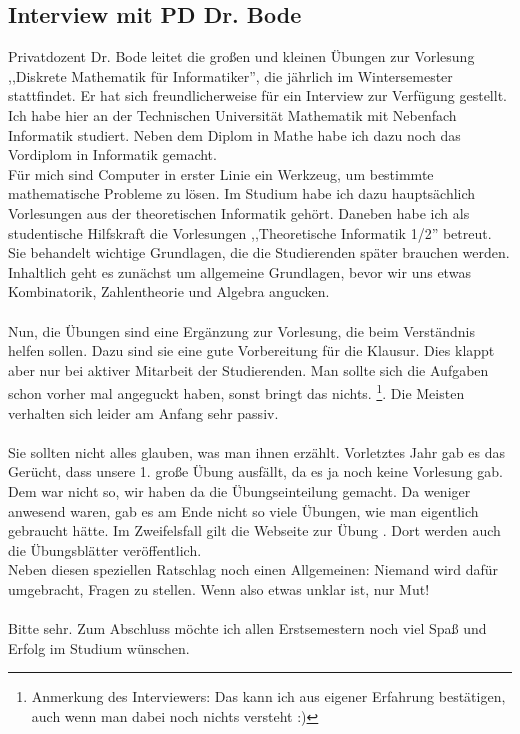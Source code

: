 \subsection{Interview mit PD Dr. Bode}

Privatdozent Dr. Bode leitet die großen und kleinen Übungen zur
Vorlesung ,,Diskrete Mathematik für Informatiker'', die jährlich im
Wintersemester stattfindet.  Er hat sich
freundlicherweise für ein Interview zur Verfügung gestellt.
 \\
Ich habe hier an der Technischen Universität Mathematik mit Nebenfach
Informatik studiert. Neben dem Diplom in Mathe habe ich dazu noch das
Vordiplom in Informatik gemacht.
\\
Für mich sind Computer in erster Linie ein Werkzeug, um bestimmte
mathematische Probleme zu lösen. Im Studium habe ich dazu
hauptsächlich Vorlesungen aus der theoretischen Informatik
gehört. Daneben habe ich als studentische Hilfskraft die Vorlesungen
,,Theoretische Informatik 1/2'' betreut.
\\
Sie behandelt wichtige Grundlagen, die die Studierenden später
brauchen werden. Inhaltlich geht es zunächst um allgemeine Grundlagen,
bevor wir uns etwas Kombinatorik, Zahlentheorie und Algebra angucken. \\
\\
Nun, die Übungen sind eine Ergänzung zur Vorlesung, die beim
Verständnis helfen sollen. Dazu sind sie eine gute Vorbereitung für
die Klausur. Dies klappt aber nur bei aktiver Mitarbeit der
Studierenden. Man sollte sich die Aufgaben schon vorher mal angeguckt
haben, sonst bringt das nichts. \footnote{Anmerkung des Interviewers:
Das kann ich aus eigener Erfahrung bestätigen, auch wenn man dabei
noch nichts versteht :)}. Die Meisten verhalten sich leider am Anfang
sehr passiv.\\
\\
Sie sollten  nicht alles glauben, was man ihnen
erzählt. Vorletztes Jahr gab es das Gerücht, dass unsere 1. große Übung
ausfällt, da es ja noch keine Vorlesung gab. Dem war nicht so, wir
haben da die Übungseinteilung gemacht. Da weniger anwesend waren, gab
es am Ende nicht so viele Übungen, wie man eigentlich gebraucht
hätte. Im Zweifelsfall gilt die Webseite zur Übung
. Dort werden auch die
Übungsblätter veröffentlich.\\
Neben diesen speziellen Ratschlag noch einen Allgemeinen: Niemand wird
dafür umgebracht, Fragen zu stellen. Wenn also etwas unklar ist, nur
Mut!\\
\\
Bitte sehr. Zum Abschluss möchte ich allen Erstsemestern noch viel
Spaß und Erfolg im Studium wünschen.
